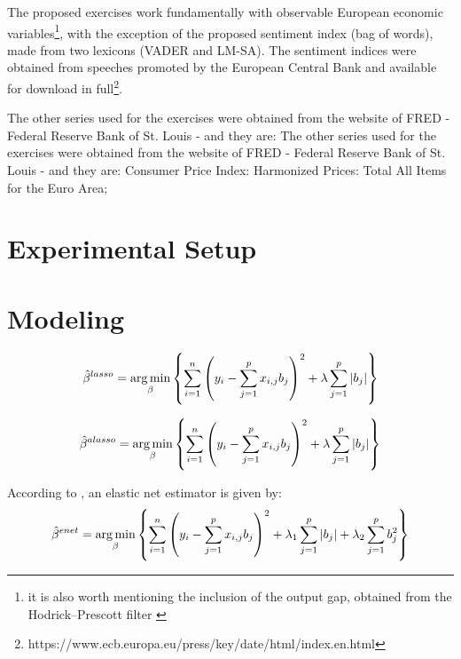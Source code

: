 The proposed exercises work fundamentally with observable European economic variables\footnote{it is also worth mentioning the inclusion of the output gap, obtained from the Hodrick–Prescott filter \citep{hodrick1997postwar}}, with the exception of the proposed sentiment index (bag of words), made from two lexicons (VADER and LM-SA). The sentiment indices were obtained from speeches promoted by the European Central Bank and available for download in full\footnote{https://www.ecb.europa.eu/press/key/date/html/index.en.html}. %

The other series used for the exercises were obtained from the website of FRED - Federal Reserve Bank of St. Louis - and they are: The other series used for the exercises were obtained from the website of FRED - Federal Reserve Bank of St. Louis - and they are: Consumer Price Index: Harmonized Prices: Total All Items for the Euro Area; 



\section{Experimental Setup}

\section{Modeling}

\begin{align} \label{eq:lasso}
    \hat{\beta}^{lasso} = \operatorname*{arg\,min}_{\beta} \left\{ \sum_{i=1}^{n} \left( y_i - \sum_{j=1}^p x_{i,j}b_j \right)^2 + \lambda \sum_{j=1}^p |b_j| \right\}
\end{align}

\begin{align} \label{eq:lassoadaptive}
    \hat{\beta}^{alasso} = \operatorname*{arg\,min}_{\beta} \left\{\sum_{i=1}^{n} \left( y_i - \sum_{j=1}^p x_{i,j}b_j \right)^2 + \lambda \sum_{j=1}^p |b_j| \right\}
\end{align}

According to \cite{zou2005regularization}, an elastic net estimator is given by:
\begin{align}\label{eq:elasticnet}
    \hat{\beta}^{enet} = \operatorname*{arg\,min}_{\beta} \left\{ \sum_{i=1}^{n} \left( y_i - \sum_{j=1}^p x_{i,j}b_j \right)^2 + \lambda_1 \sum_{j=1}^p |b_j| + \lambda_2 \sum_{j=1}^p b_j^2 \right\}
\end{align}




